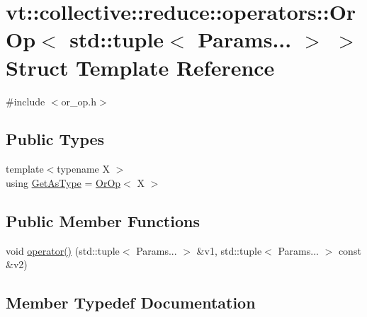 \hypertarget{structvt_1_1collective_1_1reduce_1_1operators_1_1_or_op_3_01std_1_1tuple_3_01_params_8_8_8_01_4_01_4}{}\section{vt\+:\+:collective\+:\+:reduce\+:\+:operators\+:\+:Or\+Op$<$ std\+:\+:tuple$<$ Params... $>$ $>$ Struct Template Reference}
\label{structvt_1_1collective_1_1reduce_1_1operators_1_1_or_op_3_01std_1_1tuple_3_01_params_8_8_8_01_4_01_4}


{\ttfamily \#include $<$or\+\_\+op.\+h$>$}

\subsection*{Public Types}
\begin{DoxyCompactItemize}
\item 
{\footnotesize template$<$typename X $>$ }\\using \hyperlink{structvt_1_1collective_1_1reduce_1_1operators_1_1_or_op_3_01std_1_1tuple_3_01_params_8_8_8_01_4_01_4_a1dfc36581d2fea82cac8d1d295ee3681}{Get\+As\+Type} = \hyperlink{structvt_1_1collective_1_1reduce_1_1operators_1_1_or_op}{Or\+Op}$<$ X $>$
\end{DoxyCompactItemize}
\subsection*{Public Member Functions}
\begin{DoxyCompactItemize}
\item 
void \hyperlink{structvt_1_1collective_1_1reduce_1_1operators_1_1_or_op_3_01std_1_1tuple_3_01_params_8_8_8_01_4_01_4_a0a4e3d375ae1d0625e0b6226e356abc6}{operator()} (std\+::tuple$<$ Params... $>$ \&v1, std\+::tuple$<$ Params... $>$ const \&v2)
\end{DoxyCompactItemize}


\subsection{Member Typedef Documentation}
\mbox{\label{structvt_1_1collective_1_1reduce_1_1operators_1_1_or_op_3_01std_1_1tuple_3_01_params_8_8_8_01_4_01_4_a1dfc36581d2fea82cac8d1d295ee3681}} 

